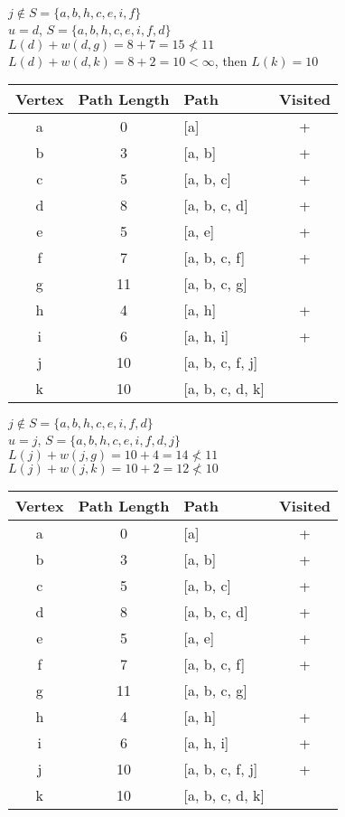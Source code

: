 \documentclass[12pt]{article}
\begin{document}
$j \notin S = \{a, b, h, c, e, i, f\}$ \\
$u = d$, $S = \{a, b, h, c, e, i, f, d\}$ \\
$L(d) + w(d, g) = 8 + 7 = 15 \not< 11$ \\
$L(d) + w(d, k) = 8 + 2 = 10 < \infty$, then $L(k) = 10$ \\

\begin{center}
\begin{tabular}{c|c|l|c}
    Vertex & Path Length & Path & Visited \\
    \hline
    a & 0 & [a] & + \\
    b & 3 & [a, b] & + \\
    c & 5 & [a, b, c] & + \\
    d & 8 & [a, b, c, d] & + \\
    e & 5 & [a, e] & + \\
    f & 7 & [a, b, c, f] & + \\
    g & 11 & [a, b, c, g] & \\
    h & 4 & [a, h] & + \\
    i & 6 & [a, h, i] & + \\
    j & 10 & [a, b, c, f, j] & \\
    k & 10 & [a, b, c, d, k] &
\end{tabular}
\end{center}

$j \notin S = \{a, b, h, c, e, i, f, d\}$ \\
$u = j$, $S = \{a, b, h, c, e, i, f, d, j\}$ \\
$L(j) + w(j, g) = 10 + 4 = 14 \not< 11$ \\
$L(j) + w(j, k) = 10 + 2 = 12 \not< 10$ \\

\begin{center}
\begin{tabular}{c|c|l|c}
    Vertex & Path Length & Path & Visited \\
    \hline
    a & 0 & [a] & + \\
    b & 3 & [a, b] & + \\
    c & 5 & [a, b, c] & + \\
    d & 8 & [a, b, c, d] & + \\
    e & 5 & [a, e] & + \\
    f & 7 & [a, b, c, f] & + \\
    g & 11 & [a, b, c, g] & \\
    h & 4 & [a, h] & + \\
    i & 6 & [a, h, i] & + \\
    j & 10 & [a, b, c, f, j] & + \\
    k & 10 & [a, b, c, d, k] &
\end{tabular}
\end{center}
\end{document}
